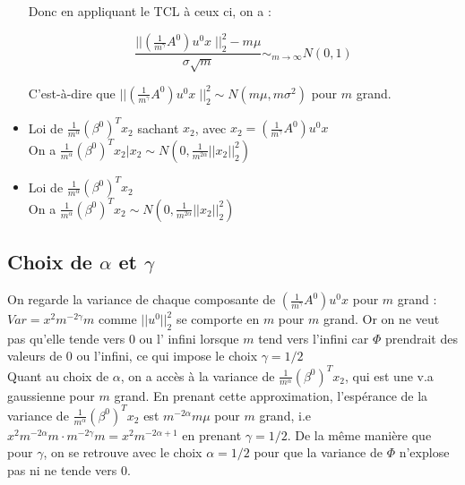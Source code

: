 \documentclass[a4paper, 11pt, french]{article}
\begin{document}
\begin{itemize}
		Donc en appliquant le TCL à ceux ci, on a :
		
		 \[
		 	\frac{|| \left(\frac{1}{m^{\gamma}} A^0 \right) u^0 x \; ||_2^2 - m \mu}{\sigma \sqrt{m}} \sim_{m \to \infty}  N(0, 1)
		 \]
		
		C'est-à-dire que $|| \left(\frac{1}{m^{\gamma}} A^0 \right) u^0 x \; ||_2^2 \sim 
		N(m \mu, m \sigma^2) $  pour $m$ grand. \\
		
		\newpage
		
		\item Loi de $ \frac{1}{m^{\alpha}} (\beta^0)^T x_2 $ sachant $x_2$, avec 
		$x_2 = \left(\frac{1}{m^{\gamma}} A^0 \right) u^0 x$ \\
		
		On a 
		$ \frac{1}{m^{\alpha}} (\beta^0)^T x_2 | x_2 \sim N(0,  \frac{1}{m^{2\alpha}}||x_2||_2^2) $
		\\
		
		\item Loi de $ \frac{1}{m^{\alpha}} (\beta^0)^T x_2 $ \\
		
		On a 
		$ \frac{1}{m^{\alpha}} (\beta^0)^T x_2 \sim N(0,  \frac{1}{m^{2\alpha}}||x_2||_2^2) $
		\\
		
	\end{itemize}

	\subsection*{Choix de $\alpha$ et $\gamma$}
	
	On regarde la variance de chaque composante de 
	$ \left(\frac{1}{m^{\gamma}} A^0 \right) u^0 x $ pour $m$ grand : 
	$ Var = x^2 m^{-2\gamma} m $ comme $|| u^0 ||_2^2$ se comporte en $m$ pour $m$ grand. Or on ne veut pas qu'elle tende vers 0 ou l' infini lorsque $m$ tend vers l'infini car $\Phi$ prendrait des valeurs de 0 ou l'infini, ce qui impose le choix $\gamma = 1/2$ \\
	
	Quant au choix de $\alpha$, on a accès à la variance de  $ \frac{1}{m^{\alpha}} (\beta^0)^T x_2 $,
	qui est une v.a gaussienne pour $m$ grand. En prenant cette approximation, l'espérance de la variance de 
	$ \frac{1}{m^{\alpha}} (\beta^0)^T x_2 $ est $ m^{-2\alpha} m \mu $ pour $m$ grand, i.e 
	$  x^2 m^{-2\alpha} m \cdot m^{-2\gamma} m = x^2 m^{-2\alpha + 1} $ en prenant $\gamma = 1/2$. De la même manière que pour $\gamma$, on se retrouve avec le choix $\alpha = 1/2$ pour que la variance de $\Phi$ n'explose pas ni ne tende vers 0.
	
\end{document}
